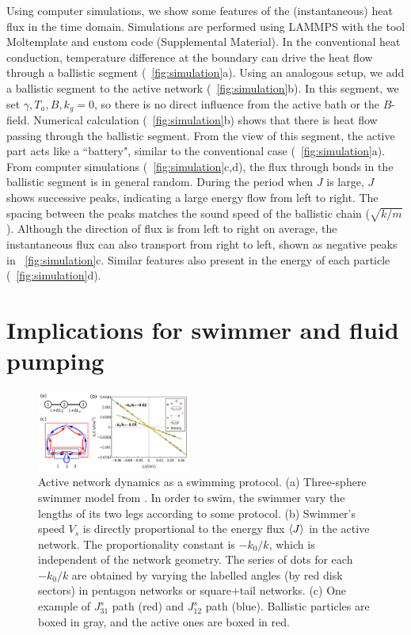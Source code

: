 \documentclass[
 preprint,
 preprintnumbers,
 amsmath,amssymb,
 aps,
 pre,
 longbibliography,
 10pt, twocolumn
]{revtex4-1}
\begin{document}
Using computer simulations, we show some features of the (instantaneous) heat flux in the time domain.
Simulations are performed using LAMMPS \cite{Plimpton1995FastDynamics} with the tool Moltemplate \cite{Jewett2013MoltemplateTool} and custom code (Supplemental Material).
In the conventional heat conduction, temperature difference at the boundary can drive the heat flow through a ballistic segment (\figurename~\ref{fig:simulation}a). Using an analogous setup, we add a ballistic segment to the active network (\figurename~\ref{fig:simulation}b). In this segment, we set $\gamma,T_a,B,k_g=0$, so there is no direct influence from the active bath or the $B$-field.
Numerical calculation (\figurename~\ref{fig:simulation}b) shows that there is heat flow passing through the ballistic segment. From the view of this segment, the active part acts like a ``battery", similar to the conventional case (\figurename~\ref{fig:simulation}a).
From computer simulations (\figurename~\ref{fig:simulation}c,d), the flux through bonds in the ballistic segment is in general random. During the period when $J$ is large, $J$ shows successive peaks, indicating a large energy flow from left to right. The spacing between the peaks matches the sound speed of the ballistic chain ($\sqrt{k/m}$). Although the direction of flux is from left to right on average, the instantaneous flux can also transport from right to left, shown as negative peaks in \figurename~\ref{fig:simulation}c. Similar features also present in the energy of each particle (\figurename~\ref{fig:simulation}d).


\section{Implications for swimmer and fluid pumping} \label{sec:swimmer}

\begin{figure}[ht]
	\centering
	\includegraphics[width=0.45\textwidth]{7_swimmer.pdf}
    \caption{Active network dynamics as a swimming protocol.
    (a) Three-sphere swimmer model from \cite{Golestanian2008AnalyticNumber}. In order to swim, the swimmer vary the lengths of its two legs according to some protocol.
    (b) Swimmer's speed $V_s$ is directly proportional to the energy flux $\expval{J}$ in the active network. The proportionality constant is $-k_0/k$, which is independent of the network geometry. The series of dots for each $-k_0/k$ are obtained by varying the labelled angles (by red disk sectors) in pentagon networks or square+tail networks.
    (c) One example of $J_{31}^s$ path (red) and $J_{12}^s$ path (blue). Ballistic particles are boxed in gray, and the active ones are boxed in red.
    }
    \label{fig:swimmer}
\end{figure}
\end{document}
